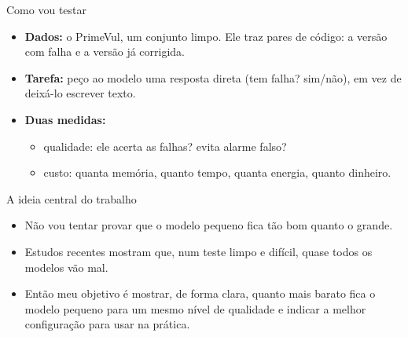 \documentclass[aspectratio=169,11pt]{beamer}
\begin{document}
\begin{frame}{Como vou testar}
  \begin{itemize}
    \item \textbf{Dados:} o PrimeVul, um conjunto limpo. Ele traz pares de código:
          a versão com falha e a versão já corrigida.
    \item \textbf{Tarefa:} peço ao modelo uma resposta direta (tem falha? sim/não),
          em vez de deixá-lo escrever texto.
    \item \textbf{Duas medidas:}
      \begin{itemize}
        \item qualidade: ele acerta as falhas? evita alarme falso?
        \item custo: quanta memória, quanto tempo, quanta energia, quanto dinheiro.
      \end{itemize}
  \end{itemize}
\end{frame}

\begin{frame}{A ideia central do trabalho}
  \begin{itemize}
    \item Não vou tentar provar que o modelo pequeno fica tão bom quanto o grande.
    \item Estudos recentes mostram que, num teste limpo e difícil, quase todos os
          modelos vão mal.
    \item Então meu objetivo é mostrar, de forma clara, quanto mais barato fica o
          modelo pequeno para um mesmo nível de qualidade e indicar a melhor
          configuração para usar na prática.
  \end{itemize}
\end{frame}
\end{document}
